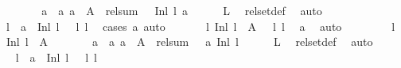 \begin{isabellebody}
\ \ \ \ \isamarkupfalse%
\ \isamarkupfalse%
\ a{}\ \ a{}{\isacharcolon}\ {\isachardoublequoteopen}a{}\ {\isasymin}\ A{}{\isachardoublequoteclose}\ \ {\isachardoublequoteopen}rel{\isacharunderscore}sum\ {\isasymchi}\ {\isasymphi}\ {\isacharparenleft}Inl\ l{}{\isacharparenright}\ a{}{\isachardoublequoteclose}\isanewline
\ \ \ \ \isamarkupfalse%
\ L\ \isamarkupfalse%
\ rel{\isacharunderscore}set{\isacharunderscore}def\ \isamarkupfalse%
\ auto\isanewline
\ \ \ \ \isamarkupfalse%
\ \isamarkupfalse%
\ l{}\ \ {\isachardoublequoteopen}a{}\ {\isacharequal}\ Inl\ l{}\ {\isasymand}\ {\isasymchi}\ l{}\ l{}{\isachardoublequoteclose}\ \isamarkupfalse%
\ {\isacharparenleft}cases\ a{}{\isacharcomma}\ auto{\isacharparenright}\isanewline
\ \ \ \ \isamarkupfalse%
\ {\isachardoublequoteopen}{\isasymexists}\ l{}{\isachardot}\ Inl\ l{}\ {\isasymin}\ A{}\ {\isasymand}\ {\isasymchi}\ l{}\ l{}{\isachardoublequoteclose}\ \isamarkupfalse%
\ a{}\ \isamarkupfalse%
\ auto\isanewline
\ \ \isamarkupfalse%
\isanewline
\ \ \ \ \isamarkupfalse%
\ l{}\ \isamarkupfalse%
\ {\isachardoublequoteopen}Inl\ l{}\ {\isasymin}\ A{}{\isachardoublequoteclose}\isanewline
\ \ \ \ \isamarkupfalse%
\ \isamarkupfalse%
\ a{}\ \ a{}{\isacharcolon}\ {\isachardoublequoteopen}a{}\ {\isasymin}\ A{}{\isachardoublequoteclose}\ \ {\isachardoublequoteopen}rel{\isacharunderscore}sum\ {\isasymchi}\ {\isasymphi}\ a{}\ {\isacharparenleft}Inl\ l{}{\isacharparenright}{\isachardoublequoteclose}\isanewline
\ \ \ \ \isamarkupfalse%
\ L\ \isamarkupfalse%
\ rel{\isacharunderscore}set{\isacharunderscore}def\ \isamarkupfalse%
\ auto\isanewline
\ \ \ \ \isamarkupfalse%
\ \isamarkupfalse%
\ l{}\ \ {\isachardoublequoteopen}a{}\ {\isacharequal}\ Inl\ l{}\ {\isasymand}\ {\isasymchi}\ l{}\ l{}{\isachardoublequoteclose}\ \isamarkupfalse%

\end{isabellebody}
